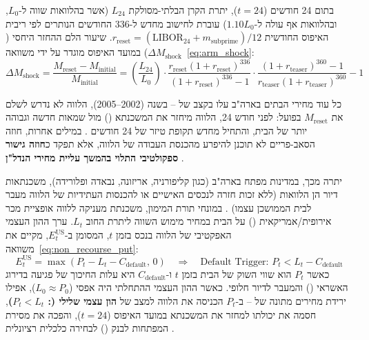 בתום \num{24} חודשים ($t = 24$), יתרת הקרן הבלתי-מסולקת $L_{24}$ (אשר בהלוואות  שווה ל-$L_0$, ובהלוואות  אף עולה ל-$1.10 L_0$) עוברת לחישוב מחדש ל-\num{336} החודשים הנותרים לפי ריבית האיפוס החודשית $r_{\text{reset}} = \left(\text{LIBOR}_{24} + m_{\text{subprime}}\right)/12$. שיעור הלם ההחזר היחסי ($\Delta M_{\text{shock}}$) במועד האיפוס מוגדר על ידי משוואה~\eqref{eq:arm_shock}:
\begin{equation}
\label{eq:arm_shock}
\Delta M_{\text{shock}} = \frac{M_{\text{reset}} - M_{\text{initial}}}{M_{\text{initial}}} = \left(\frac{L_{24}}{L_0}\right) \cdot \frac{r_{\text{reset}}\left(1 + r_{\text{reset}}\right)^{336}}{\left(1 + r_{\text{reset}}\right)^{336} - 1} \cdot \frac{\left(1 + r_{\text{teaser}}\right)^{360} - 1}{r_{\text{teaser}}\left(1 + r_{\text{teaser}}\right)^{360}} - 1
\end{equation}

כל עוד מחירי הבתים בארה"ב עלו בקצב של -- בשנה (\num{2002}--\num{2005}), הלווה לא נדרש לשלם את $M_{\text{reset}}$ בפועל: לפני חודש \num{24}, הלווה מיחזר את המשכנתא () מול שמאות חדשה וגבוהה יותר של הבית, והתחיל מחדש תקופת טיזר של \num{24} חודשים \cite{gorton2009securitized,foote2008subprime}. במילים אחרות, חוזה הסאב-פריים לא תוכנן להיפרע מהכנסת העבודה של הלווה, אלא תפקד כ\textbf{חוזה גישור ספקולטיבי התלוי בהמשך עליית מחירי הנדל"ן} \cite{gorton2009securitized}.

יתרה מכך, במדינות מפתח בארה"ב (כגון קליפורניה, אריזונה, נבאדה ופלורידה), משכנתאות דיור הן הלוואות \textbf{} (ללא זכות חזרה לנכסים האישיים או להכנסות העתידיות של הלווה מעבר לבית הממושכן עצמו) \cite{ghent2011recourse}. במונחי תורת המימון, משכנתת  מעניקה ללווה אופציית מכר אירופית/אמריקאית () על הבית במחיר מימוש השווה ליתרת החוב $L_t$. ערך ההון העצמי האפקטיבי של הלווה בנכס בזמן $t$, המסומן ב-$E_t^{\text{US}}$, מקיים את משוואה~\eqref{eq:non_recourse_put}:
\begin{equation}
\label{eq:non_recourse_put}
E_t^{\text{US}} = \max\left(P_t - L_t - C_{\text{default}},\, 0\right) \quad \Longrightarrow \quad \text{Default Trigger: } P_t < L_t - C_{\text{default}}
\end{equation}
כאשר $P_t$ הוא שווי השוק של הבית בזמן $t$ ו-$C_{\text{default}}$ היא עלות החיכוך של פגיעה בדירוג האשראי () והמעבר לדיור חלופי. כאשר ההון העצמי ההתחלתי היה אפסי ($L_0 \approx P_0$), אפילו ירידת מחירים מתונה של -- ב-$P_t$ הכניסה את הלווה למצב של \textbf{הון עצמי שלילי (: $P_t < L_t$)}, חסמה את יכולתו למחזר את המשכנתא במועד האיפוס ($t=24$), והפכה את מסירת המפתחות לבנק () לבחירה כלכלית רציונלית \cite{foote2008subprime,ghent2011recourse}.

